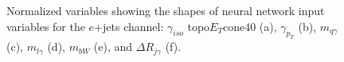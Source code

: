 \begin{figure}[h!]
\vspace{-4.5mm}
\hfil
{}
\caption{Normalized variables showing the shapes of neural network input variables for the $e$+jets channel: $\gamma_{iso}$ topo$E_{T}$cone40 (a), $\gamma_{p_T}$ (b), $m_{q \gamma}$ (c), $m_{l \gamma}$ (d), $m_{bW}$ (e), and $\Delta R_{j\gamma}$ (f).}
\label{fig:VarPlotsej1}
\end{figure}

